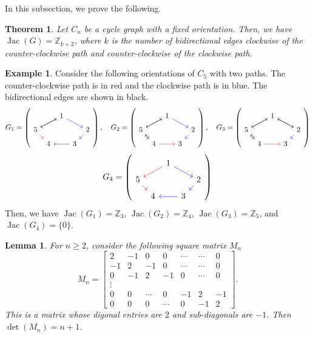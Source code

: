 \documentclass[11pt,reqno]{amsart}
\DeclareMathOperator{\Jac}{Jac}
\theoremstyle{definition}
\newtheorem{myeg}[mydef]{Example}
\theoremstyle{plain}
\newtheorem{mythm}[mydef]{Theorem}
\newtheorem{lemma}[mydef]{Lemma}
\begin{document}
In this subsection, we prove the following. 

\begin{mythm}\label{theorem: two path}
Let $C_n$ be a cycle graph with a fixed orientation. Then, we have $\Jac(G)=\mathbb{Z}_{k+2}$, where $k$ is the number of bidirectional edges clockwise of the counter-clockwise path and counter-clockwise of the clockwise path.
\end{mythm}

\begin{myeg}
Consider the following orientations of $C_5$ with two paths. The counter-clockwise path is in red and the clockwise path is in blue.
The bidirectional edges are shown in black.
\[
G_1=\left( \begin{tikzcd}[row sep=0.2cm, column sep=0.15cm]
	& & 1 \arrow[drr,blue] \arrow[dll]& &  \\
	5 \arrow[urr] \arrow[dr,red] & & & & 2 \arrow[dl,blue] \\
	& 4& & 3 \arrow[ll,blue]& \end{tikzcd} \right),
\quad G_2=\left( \begin{tikzcd}[row sep=0.2cm, column sep=0.15cm]
& & 1 \arrow[drr,blue] \arrow[dll]& &  \\
5 \arrow[urr] \arrow[dr] & & & & 2 \arrow[dl,blue] \\
& 4\arrow[rr,red]\arrow[ul] & & 3 &
\end{tikzcd} \right),
\quad G_3=\left( \begin{tikzcd}[row sep=0.2cm, column sep=0.15cm]
& & 1 \arrow[drr] \arrow[dll]& &  \\
5 \arrow[urr] \arrow[dr] & & & & 2 \arrow[dl,blue] \arrow[ull] \\
& 4\arrow[rr,red]\arrow[ul] & & 3 &
\end{tikzcd} \right)
\]
\[
G_4=\left( \begin{tikzcd}[row sep=0.2cm, column sep=0.15cm]
& & 1 \arrow[drr,blue] \arrow[dll,red]& &  \\
5  \arrow[dr,red] & & & & 2 \arrow[dl,blue] \\
& 4 & & 3 \arrow[ll,blue]&
\end{tikzcd} \right)
\]
Then, we have $\Jac(G_1)=\mathbb{Z}_3$, $\Jac(G_2)=\mathbb{Z}_4$, $\Jac(G_3)=\mathbb{Z}_5$, and $\Jac(G_4)=\{0\}$.
\end{myeg}


\begin{lemma} \label{obj3}
For $n \ge 2$, consider the following square matrix $M_n$
\begin{equation}
M_n = \begin{bmatrix}
2 & -1 & 0 & 0& \cdots & \cdots & 0 \\
-1 & 2 & -1& 0& \cdots &\cdots & 0 \\
0 & -1 & 2 & -1 & 0& \cdots & 0 \\
\vdots \\
0 & 0 & \cdots& 0 & -1 & 2 & -1 \\
0 & 0 &0 & \cdots & 0 &  -1 & 2 
\end{bmatrix}.
\end{equation}
This is a matrix whose digonal entries are $2$ and sub-diagonals are $-1$. Then $\det (M_n) = n+1$. 
\end{lemma}
\end{document}
